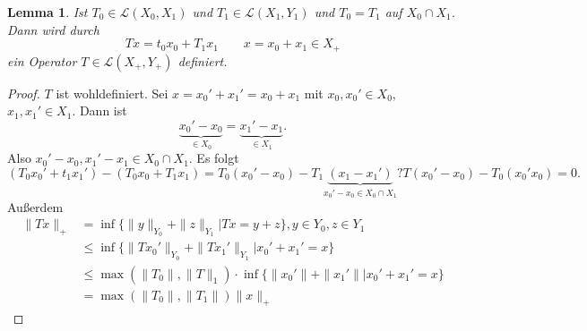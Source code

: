 \documentclass[
paper=a4,
bibtotocnumbered,
liststotocnumbered,
tablecaptionabove,
pointlessnumbers,
twoside,
openright,
10pt
]
{report}
\newtheorem{lem}[thm]{Lemma}
\theoremstyle{definition}
\numberwithin{equation}{chapter}
\begin{document}
\begin{lem}\label{4.12}
Ist $T_0 \in \mathcal L(X_0, X_1)$ und $T_1 \in \mathcal L(X_1, Y_1)$ und $T_0 = T_1$ auf $X_0 \cap X_1$.  Dann wird durch 
\begin{equation}
T x = t_0 x_0 + T_1 x_1 \qquad x= x_0 + x_1 \in X_+ 
\end{equation}
ein Operator $T\in \mathcal L(X_+, Y_+)$ definiert.
\end{lem}
\begin{proof}
$T$ ist wohldefiniert. Sei $x= x_0'+ x_1' = x_0 + x_1$ mit $x_0, x_0' \in X_0$, $x_1, x_1'\in X_1$. Dann ist
\begin{equation}
\underbrace{x_0' - x_0}_{\in X_0} = \underbrace{x_1' - x_1}_{\in X_1}.
\end{equation}
Also $x_0 '-x_0, x_1' -x_1\in X_0 \cap X_1$. Es folgt 
\begin{equation}
(T_0 x_0' + t_1 x_1') - (T_0 x_0 + T_1 x_1) = T_0 (x_0' -x_0) - T_1 \underbrace{(x_1 - x_1')}_{x_0' - x_0 \in X_0 \cap X_1}? T(x_0' - x_0) - T_0 (x_0' x_0) =0.
\end{equation}
Außerdem
\begin{align*}
\|Tx\|_+ &= \inf \{ \| y\|_{Y_0} + \| z\|_{Y_1} | Tx = y+z\}, y\in Y_0, z\in Y_1 \\
 &\le \inf\{ \| Tx_0' \|_{Y_0} + \| Tx_1' \|_{Y_1}| x_0' + x_1' = x\}\\
 &\le \max ( \| T_0 \|, \| T\|_1) \cdot \inf\{ \| x_0'\| + \| x_1'\| | x_0' + x_1' = x\}\\
 &= \max (\| T_0 \|, \| T_1\|) \| x\|_+ 
\end{align*}
\end{proof}
\end{document}

